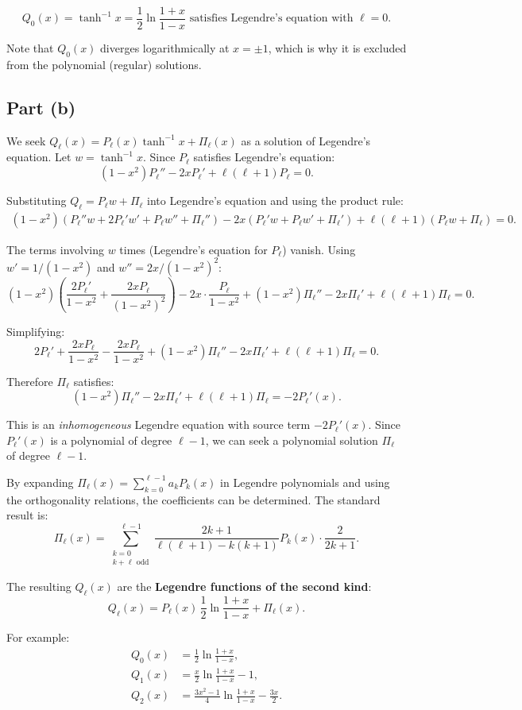 \documentclass[12pt]{article}
\begin{document}
\[
\boxed{Q_0(x) = \tanh^{-1}x = \frac{1}{2}\ln\frac{1+x}{1-x} \text{ satisfies Legendre's equation with } \ell = 0.}
\]

Note that $Q_0(x)$ diverges logarithmically at $x = \pm 1$, which is why it is excluded from the polynomial (regular) solutions.

\subsection*{Part (b)}

We seek $Q_\ell(x) = P_\ell(x)\tanh^{-1}x + \Pi_\ell(x)$ as a solution of Legendre's equation. Let $w = \tanh^{-1}x$. Since $P_\ell$ satisfies Legendre's equation:
\[
(1-x^2)P_\ell'' - 2xP_\ell' + \ell(\ell+1)P_\ell = 0.
\]

Substituting $Q_\ell = P_\ell w + \Pi_\ell$ into Legendre's equation and using the product rule:
\begin{align}
(1-x^2)(P_\ell'' w + 2P_\ell' w' + P_\ell w'' + \Pi_\ell'') - 2x(P_\ell' w + P_\ell w' + \Pi_\ell') + \ell(\ell+1)(P_\ell w + \Pi_\ell) = 0.
\end{align}

The terms involving $w$ times (Legendre's equation for $P_\ell$) vanish. Using $w' = 1/(1-x^2)$ and $w'' = 2x/(1-x^2)^2$:
\[
(1-x^2)\left(\frac{2P_\ell'}{1-x^2} + \frac{2xP_\ell}{(1-x^2)^2}\right) - 2x\cdot\frac{P_\ell}{1-x^2} + (1-x^2)\Pi_\ell'' - 2x\Pi_\ell' + \ell(\ell+1)\Pi_\ell = 0.
\]

Simplifying:
\[
2P_\ell' + \frac{2xP_\ell}{1-x^2} - \frac{2xP_\ell}{1-x^2} + (1-x^2)\Pi_\ell'' - 2x\Pi_\ell' + \ell(\ell+1)\Pi_\ell = 0.
\]

Therefore $\Pi_\ell$ satisfies:
\[
\boxed{(1-x^2)\Pi_\ell'' - 2x\Pi_\ell' + \ell(\ell+1)\Pi_\ell = -2P_\ell'(x).}
\]

This is an \emph{inhomogeneous} Legendre equation with source term $-2P_\ell'(x)$. Since $P_\ell'(x)$ is a polynomial of degree $\ell-1$, we can seek a polynomial solution $\Pi_\ell$ of degree $\ell-1$.

By expanding $\Pi_\ell(x) = \sum_{k=0}^{\ell-1}a_k P_k(x)$ in Legendre polynomials and using the orthogonality relations, the coefficients can be determined. The standard result is:
\[
\Pi_\ell(x) = \sum_{\substack{k=0 \\ k+\ell \text{ odd}}}^{\ell-1}\frac{2k+1}{\ell(\ell+1)-k(k+1)}P_k(x) \cdot \frac{2}{2k+1}.
\]

The resulting $Q_\ell(x)$ are the \textbf{Legendre functions of the second kind}:
\[
Q_\ell(x) = P_\ell(x)\,\frac{1}{2}\ln\frac{1+x}{1-x} + \Pi_\ell(x).
\]

For example:
\begin{align}
Q_0(x) &= \frac{1}{2}\ln\frac{1+x}{1-x}, \\
Q_1(x) &= \frac{x}{2}\ln\frac{1+x}{1-x} - 1, \\
Q_2(x) &= \frac{3x^2-1}{4}\ln\frac{1+x}{1-x} - \frac{3x}{2}.
\end{align}
\end{document}
